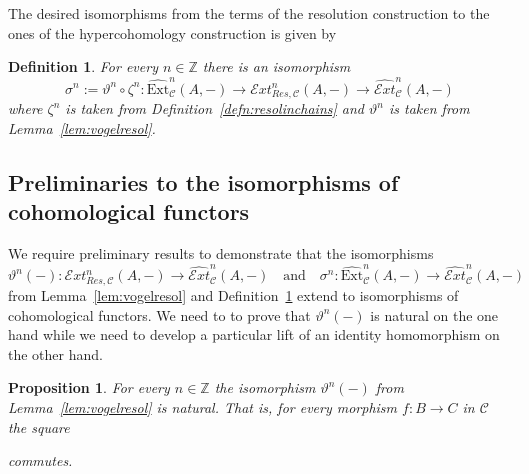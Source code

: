 \documentclass[12pt,a4paper]{article}
\numberwithin{equation}{section}
\newtheorem{prop}[thm]{Proposition}
\newtheorem{defn}[thm]{Definition}
\theoremstyle{nonumberplain}
\begin{document}
The desired isomorphisms from the terms of the resolution construction to the ones of the hypercohomology construction is given by

\begin{defn}\label{defn:hyperresolcohom}
For every $n \in \mathbb{Z}$ there is an isomorphism
\[ \sigma^n := \vartheta^n \circ \zeta^n: \widehat{\mathrm{Ext}}_{\mathcal{C}}^n(A, -) \rightarrow \mathcal{E}xt_{Res, \mathcal{C}}^n(A, -) \rightarrow \widehat{\mathcal{E}xt}_{\mathcal{C}}^n(A, -) \]
where $\zeta^n$ is taken from Definition~\ref{defn:resolinchains} and $\vartheta^n$ is taken from Lemma~\ref{lem:vogelresol}.
\end{defn}

\subsection{Preliminaries to the isomorphisms of cohomological functors}

We require preliminary results to demonstrate that the isomorphisms 
\[ \vartheta^n(-): \mathcal{E}xt_{Res, \mathcal{C}}^n(A, -) \rightarrow \widehat{\mathcal{E}xt}_{\mathcal{C}}^n(A, -) \quad \text{and} \quad \sigma^n: \widehat{\mathrm{Ext}}_{\mathcal{C}}^n(A, -) \rightarrow \widehat{\mathcal{E}xt}_{\mathcal{C}}^n(A, -) \]
from Lemma~\ref{lem:vogelresol} and Definition~\ref{defn:hyperresolcohom} extend to isomorphisms of cohomological functors. We need to to prove that $\vartheta^n(-)$ is natural on the one hand while we need to develop a particular lift of an identity homomorphism on the other hand.

\begin{prop}\label{prop:thetanatural}
For every $n \in \mathbb{Z}$ the isomorphism $\vartheta^n(-)$ from Lemma~\ref{lem:vogelresol} is natural. That is, for every morphism $f: B \rightarrow C$ in $\mathcal{C}$ the square
\begin{center}
\end{center}
commutes.
\end{prop}
\end{document}
